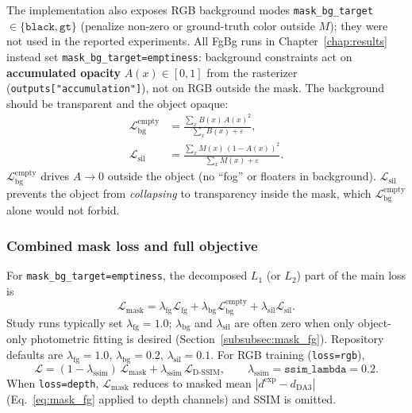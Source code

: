 \documentclass{report}
\newcommand{\code}[1]{\nolinkurl{#1}}
\begin{document}
The implementation also exposes RGB background modes \texttt{mask\_bg\_target}$\in\{\texttt{black},\texttt{gt}\}$ (penalize non-zero or ground-truth color outside $M$); they were not used in the reported experiments. All FgBg runs in Chapter~\ref{chap:results} instead set \texttt{mask\_bg\_target=emptiness}: background constraints act on \textbf{accumulated opacity} $A(x)\in[0,1]$ from the rasterizer (\code{outputs["accumulation"]}), not on RGB outside the mask. The background should be transparent and the object opaque:
\begin{align}
\mathcal{L}_{\mathrm{bg}}^{\mathrm{empty}}
&=\frac{\sum_{x} B(x)\,A(x)^2}{\sum_{x} B(x) + \varepsilon},
\label{eq:mask_bg_empty}\\
\mathcal{L}_{\mathrm{sil}}
&=\frac{\sum_{x} M(x)\,(1-A(x))^2}{\sum_{x} M(x) + \varepsilon}.
\label{eq:mask_sil}
\end{align}
$\mathcal{L}_{\mathrm{bg}}^{\mathrm{empty}}$ drives $A\to 0$ outside the object (no ``fog'' or floaters in background). $\mathcal{L}_{\mathrm{sil}}$ prevents the object from \emph{collapsing} to transparency inside the mask, which $\mathcal{L}_{\mathrm{bg}}^{\mathrm{empty}}$ alone would not forbid.

\subsubsection{Combined mask loss and full objective}
\label{subsubsec:mask_combined}

For \texttt{mask\_bg\_target=emptiness}, the decomposed $L_1$ (or $L_2$) part of the main loss is
\begin{equation}
\mathcal{L}_{\mathrm{mask}}
=\lambda_{\mathrm{fg}}\mathcal{L}_{\mathrm{fg}}
+\lambda_{\mathrm{bg}}\mathcal{L}_{\mathrm{bg}}^{\mathrm{empty}}
+\lambda_{\mathrm{sil}}\mathcal{L}_{\mathrm{sil}}.
\label{eq:mask_combined}
\end{equation}
Study runs typically set $\lambda_{\mathrm{fg}}=1.0$; $\lambda_{\mathrm{bg}}$ and $\lambda_{\mathrm{sil}}$ are often zero when only object-only photometric fitting is desired (Section~\ref{subsubsec:mask_fg}). Repository defaults are $\lambda_{\mathrm{fg}}=1.0$, $\lambda_{\mathrm{bg}}=0.2$, $\lambda_{\mathrm{sil}}=0.1$. For RGB training (\texttt{loss=rgb}),
\begin{equation}
\mathcal{L}
=(1-\lambda_{\mathrm{ssim}})\,\mathcal{L}_{\mathrm{mask}}
+\lambda_{\mathrm{ssim}}\,\mathcal{L}_{\mathrm{D\text{-}SSIM}},
\qquad \lambda_{\mathrm{ssim}}=\texttt{ssim\_lambda}=0.2.
\label{eq:mask_total_rgb}
\end{equation}
When \texttt{loss=depth}, $\mathcal{L}_{\mathrm{mask}}$ reduces to masked mean $|d^{\mathrm{exp}}-d_{\mathrm{DA3}}|$ (Eq.~\eqref{eq:mask_fg} applied to depth channels) and SSIM is omitted.
\end{document}
